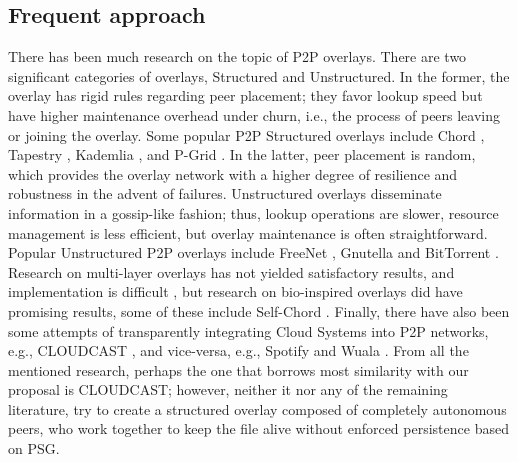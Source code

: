 \documentclass[runningheads]{llncs}
\begin{document}
\subsection
{Frequent approach}There has been much research on the topic of P2P overlays. There are two significant categories of overlays, Structured and Unstructured. In the former, the overlay has rigid rules regarding peer placement; they favor lookup speed but have higher maintenance overhead under churn, i.e., the process of peers leaving or joining the overlay. Some popular P2P Structured overlays include Chord \cite{chord}, Tapestry \cite{tapestry}, Kademlia \cite{kademlia}, and P-Grid \cite{pgrid}. In the latter, peer placement is random, which provides the overlay network with a higher degree of resilience and robustness in the advent of failures. Unstructured overlays disseminate information in a gossip-like fashion; thus, lookup operations are slower, resource management is less efficient, but overlay maintenance is often straightforward. Popular  Unstructured P2P overlays include FreeNet \cite{freenet}, Gnutella \cite{gnutella-rfc} and BitTorrent \cite{bittorrent}. Research on multi-layer overlays has not yielded satisfactory results, and implementation is difficult \cite{sotart}, but research on bio-inspired overlays did have promising results, some of these include Self-Chord \cite{selfchord}. Finally, there have also been some attempts of transparently integrating Cloud Systems into P2P networks, e.g., CLOUDCAST \cite{cloudcast}, and vice-versa, e.g., Spotify \cite{spotify} and Wuala \cite{wuala}. From all the mentioned research, perhaps the one that borrows most similarity with our proposal is CLOUDCAST; however, neither it nor any of the remaining literature, try to create a structured overlay composed of completely autonomous peers, who work together to keep the file alive without enforced persistence based on PSG.
\end{document}
